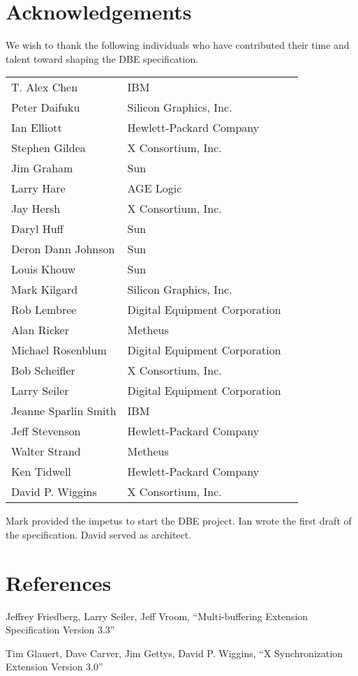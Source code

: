 \pagebreak[4]
\section{Acknowledgements}

We wish to thank the following individuals who have contributed their
time and talent toward shaping the DBE specification.

\begin{tabular}{lll}
T. Alex Chen & IBM \\
Peter Daifuku & Silicon Graphics, Inc. \\
Ian Elliott & Hewlett-Packard Company \\
Stephen Gildea & X Consortium, Inc. \\
Jim Graham & Sun \\
Larry Hare & AGE Logic \\
Jay Hersh & X Consortium, Inc. \\
Daryl Huff & Sun \\
Deron Dann Johnson & Sun \\
Louis Khouw & Sun \\
Mark Kilgard & Silicon Graphics, Inc. \\
Rob Lembree & Digital Equipment Corporation \\
Alan Ricker & Metheus \\
Michael Rosenblum & Digital Equipment Corporation \\
Bob Scheifler & X Consortium, Inc. \\
Larry Seiler & Digital Equipment Corporation \\
Jeanne Sparlin Smith & IBM \\
Jeff Stevenson & Hewlett-Packard Company \\
Walter Strand & Metheus \\
Ken Tidwell & Hewlett-Packard Company \\
David P. Wiggins & X Consortium, Inc. \\
\end{tabular}

Mark provided the impetus to start the DBE project.  Ian wrote the
first draft of the specification.  David served as architect.

\section{References}

Jeffrey Friedberg, Larry Seiler, Jeff Vroom, ``Multi-buffering Extension
Specification Version 3.3''

Tim Glauert, Dave Carver, Jim Gettys, David P. Wiggins,
``X Synchronization Extension Version 3.0'' 



